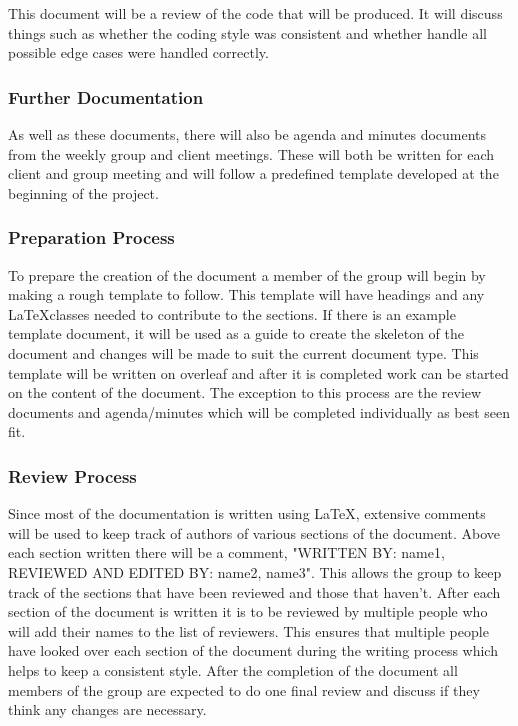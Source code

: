 \documentclass{article}
\newcounter{subsubsubsection}[subsubsection]
\begin{document}
\begin{adjustwidth}{3em}{0pt}
This document will be a review of the code that will be produced. It will discuss things such as whether the  coding style was consistent and whether handle all possible edge cases were handled correctly.
\end{adjustwidth}

\subsubsection{Further Documentation}
\begin{adjustwidth}{2em}{0pt}
As well as these documents, there will also be agenda and minutes documents from the weekly group and client meetings. These will both be written for each client and group meeting and will follow a predefined template developed at the beginning of the project.
\end{adjustwidth}

\subsubsection{Preparation Process}
\begin{adjustwidth}{2em}{0pt}
To prepare the creation of the document a member of the group will begin by making a rough template to follow. This template will have headings and any \LaTeX classes needed to contribute to the sections. If there is an example template document, it will be used as a guide to create the skeleton of the document and changes will be made to suit the current document type. This template will be written on overleaf and after it is completed work can be started on the content of the document. The exception to this process are the review documents and agenda/minutes which will be completed individually as best seen fit. 
\end{adjustwidth}

\subsubsection{Review Process}
\begin{adjustwidth}{2em}{0pt}
Since most of the documentation is written using \LaTeX, extensive comments will be used to keep track of authors of various sections of the document. Above each section written there will be a comment, "WRITTEN BY: name1, REVIEWED AND EDITED BY: name2, name3". This allows the group to keep track of the sections that have been reviewed and those that haven't. After each section of the document is written it is to be reviewed by multiple people who will add their names to the list of reviewers. This ensures that multiple people have looked over each section of the document during the writing process which helps to keep a consistent style. After the completion of the document all members of the group are expected to do one final review and discuss if they think any changes are necessary.
\end{adjustwidth}
\end{document}
